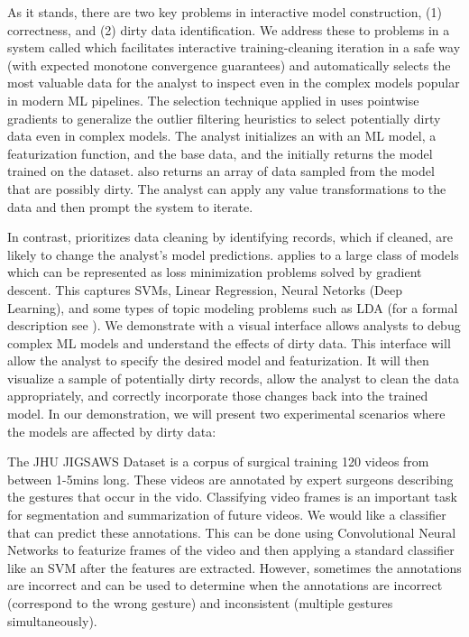 As it stands, there are two key problems in interactive model construction, (1) correctness, and (2) dirty data identification.
We address these to problems in a system called \sys which facilitates interactive training-cleaning iteration in a safe way (with expected monotone convergence guarantees) and automatically selects the most valuable data for the analyst to inspect even in the complex models popular in modern ML pipelines.
The selection technique applied in \sys uses pointwise gradients to generalize the outlier filtering heuristics to select potentially dirty data even in complex models. 
The analyst initializes an \sys with an ML model, a featurization function, and the base data, and the \sys initially returns the model trained on the dataset.
\sys also returns an array of data sampled from the model that are possibly dirty.
The analyst can apply any value transformations to the data and then prompt the system to iterate. 

In contrast, \sys prioritizes data cleaning by identifying records, which if cleaned, are likely to change the analyst's model predictions.
\sys applies to a large class of models which can be represented as loss minimization problems solved by gradient descent.
This captures SVMs, Linear Regression, Neural Netorks (Deep Learning), and some types of topic modeling problems such as LDA (for a formal description see \cite{activecleanarxiv}).
We demonstrate \sys with a visual interface allows analysts to debug complex ML models and understand the effects of dirty data.
This interface will allow the analyst to specify the desired model and featurization.
It will then visualize a sample of potentially dirty records, allow the analyst to clean the data appropriately, and correctly incorporate those changes back into the trained model.  
In our demonstration, we will present two experimental scenarios where the models are affected by dirty data: 

\begin{example}\sloppy
The JHU JIGSAWS Dataset is a corpus of surgical training 120 videos from between 1-5mins long.
These videos are annotated by expert surgeons describing the gestures that occur in the vido. 
Classifying video frames is an important task for segmentation and summarization of future videos.
We would like a classifier that can predict these annotations.
This can be done using Convolutional Neural Networks to featurize frames of the video and then applying a standard classifier like an SVM after the features are extracted.
However, sometimes the annotations are incorrect and \sys can be used to determine when the annotations are incorrect (correspond to the wrong gesture) and inconsistent (multiple gestures simultaneously).
\end{example}

